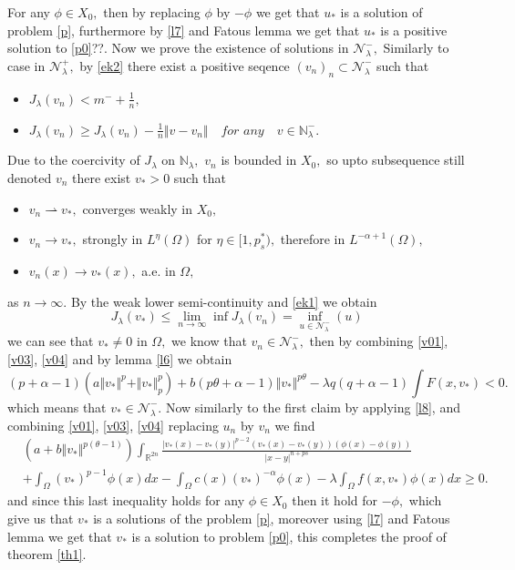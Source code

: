 \documentclass[10pt,twoside,reqno,centertags,draft]{amsart}
\begin{document}
For any $ \phi \in X_0,$ then by replacing $ \phi$ by $ -\phi$ we get that $ u_*$ is a solution of problem \ref{p}, furthermore by \ref{l7} and Fatous lemma
we get that $ u_*$ is a positive solution to \ref{p0}??. Now we prove the existence of solutions in $ \mathcal{N}_{\lambda}^{-},$
Similarly to case in $ \mathcal{N}_{\lambda}^{+},$ by \ref{ek2} there exist a positive seqence $ (v_n)_n \subset \mathcal{N}_{\lambda}^{-}$ such that 
\begin{itemize}
\item $ J_{\lambda}(v_n) <m^- +\frac{1}{n},$
\item $ J_{\lambda}(v_n) \geq J_{\lambda}(v_n) -\frac{1}{n}\Vert v -v_n\Vert \quad \textit{for any}\quad v \in \mathbb{N}_{\lambda}^{-}.$
\end{itemize}
Due to the coercivity of $ J_{\lambda}$ on $  \mathbb{N}_{\lambda},$ $ v_n$ is bounded in $ X_0,$ so upto subsequence still denoted $ v_n$ there exist $ v_* >0$
such that 
\begin{itemize}
\item $ v_n \rightharpoonup v_*,$ converges weakly in $ X_0,$
\item $ v_n \longrightarrow v_*,$ strongly in $ L^{\eta}(\Omega)$ for $ \eta \in [1, p_s^*),$ therefore in $ L^{-\alpha +1}(\Omega),$
\item $ v_n(x) \longrightarrow v_*(x),$ a.e. in $ \Omega,$
\end{itemize}
as $ n \to \infty.$ By the weak lower semi-continuity and \ref{ek1} we obtain 
\begin{equation*}
J_{\lambda}(v_*) \leq \lim_{n \to \infty}\inf J_{\lambda}(v_n) =\inf_{u \in \mathcal{N}_{\lambda}^{-}}(u)
\end{equation*} 
we can see that $ v_* \neq 0$ in $ \Omega,$ we know that $ v_n \in \mathcal{N}_{\lambda}^{-},$ then by combining \ref{v01}, \ref{v03}, \ref{v04} and by 
lemma \ref{l6} we obtain
\begin{equation}
(p +\alpha -1) \left(a\Vert v_* \Vert^p + \Vert v_* \Vert_{p}^{p}\right) + b(p \theta +\alpha -1)\Vert v_* \Vert^{p \theta} - \lambda q (q +\alpha -1) \int F(x,v_*) <0.
\end{equation}
which means that $ v_* \in \mathcal{N}_{\lambda}^{-}.$ Now similarly to the first claim by applying \ref{l8}, and combining \ref{v01}, \ref{v03}, \ref{v04}
replacing $ u_n$ by $ v_n$ we find 
\begin{equation*}
\begin{aligned}
& \left(a +b\Vert v_* \Vert^{p(\theta -1)}\right) \int_{\mathbb{R}^{2n}} \frac{\vert v_*(x) - v_*(y) \vert^{p-2}(v_*(x) - v_*(y))(\phi(x) - \phi(y))}{\vert x-y \vert^{n + ps}}\\
& + \int_{\Omega}(v_*)^{p -1} \phi(x) dx  - \int_{\Omega} c(x) (v_*)^{-\alpha} \phi(x) - 
\lambda \int_{\Omega} f(x,v_*) \phi(x)dx \geq 0.
\end{aligned}
\end{equation*}
and since this last inequality holds for any $ \phi \in X_0$ then it hold for $ -\phi,$ which give us that $ v_*$ is a solutions of the problem \ref{p},
moreover using \ref{l7} and Fatous lemma we get that $ v_*$ is a solution to problem \ref{p0}, this completes the proof of theorem \ref{th1}. 
\end{document}
